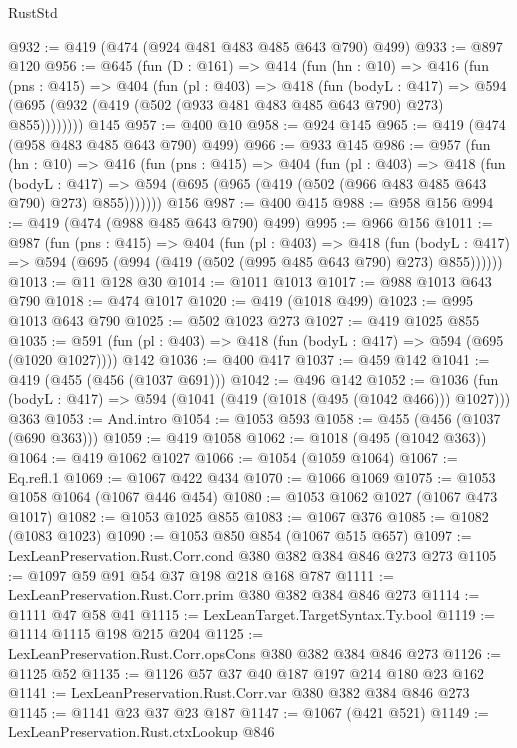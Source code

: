 \begin{lexlean}{RustStd}
\begin{coremodule}
@932 := @419 (@474 (@924 @481 @483 @485 @643 @790) @499)
@933 := @897 @120
@956 := @645
    (fun (D : @161) =>
    @414
      (fun (hn : @10) =>
      @416
        (fun (pns : @415) =>
        @404
          (fun (pl : @403) =>
          @418
            (fun (bodyL : @417) =>
            @594 (@695 (@932 (@419 (@502 (@933 @481 @483 @485 @643 @790) @273) @855))))))))
    @145
@957 := @400 @10
@958 := @924 @145
@965 := @419 (@474 (@958 @483 @485 @643 @790) @499)
@966 := @933 @145
@986 := @957
    (fun (hn : @10) =>
    @416
      (fun (pns : @415) =>
      @404
        (fun (pl : @403) =>
        @418
          (fun (bodyL : @417) =>
          @594 (@695 (@965 (@419 (@502 (@966 @483 @485 @643 @790) @273) @855)))))))
    @156
@987 := @400 @415
@988 := @958 @156
@994 := @419 (@474 (@988 @485 @643 @790) @499)
@995 := @966 @156
@1011 := @987
    (fun (pns : @415) =>
    @404
      (fun (pl : @403) =>
      @418
        (fun (bodyL : @417) => @594 (@695 (@994 (@419 (@502 (@995 @485 @643 @790) @273) @855))))))
@1013 := @11 @128 @30
@1014 := @1011 @1013
@1017 := @988 @1013 @643 @790
@1018 := @474 @1017
@1020 := @419 (@1018 @499)
@1023 := @995 @1013 @643 @790
@1025 := @502 @1023 @273
@1027 := @419 @1025 @855
@1035 := @591 (fun (pl : @403) => @418 (fun (bodyL : @417) => @594 (@695 (@1020 @1027)))) @142
@1036 := @400 @417
@1037 := @459 @142
@1041 := @419 (@455 (@456 (@1037 @691)))
@1042 := @496 @142
@1052 := @1036 (fun (bodyL : @417) => @594 (@1041 (@419 (@1018 (@495 (@1042 @466))) @1027))) @363
@1053 := And.intro
@1054 := @1053 @593
@1058 := @455 (@456 (@1037 (@690 @363)))
@1059 := @419 @1058
@1062 := @1018 (@495 (@1042 @363))
@1064 := @419 @1062 @1027
@1066 := @1054 (@1059 @1064)
@1067 := Eq.refl.{1}
@1069 := @1067 @422 @434
@1070 := @1066 @1069
@1075 := @1053 @1058 @1064 (@1067 @446 @454)
@1080 := @1053 @1062 @1027 (@1067 @473 @1017)
@1082 := @1053 @1025 @855
@1083 := @1067 @376
@1085 := @1082 (@1083 @1023)
@1090 := @1053 @850 @854 (@1067 @515 @657)
@1097 := LexLeanPreservation.Rust.Corr.cond @380 @382 @384 @846 @273 @273
@1105 := @1097 @59 @91 @54 @37 @198 @218 @168 @787
@1111 := LexLeanPreservation.Rust.Corr.prim @380 @382 @384 @846 @273
@1114 := @1111 @47 @58 @41
@1115 := LexLeanTarget.TargetSyntax.Ty.bool
@1119 := @1114 @1115 @198 @215 @204
@1125 := LexLeanPreservation.Rust.Corr.opsCons @380 @382 @384 @846 @273
@1126 := @1125 @52
@1135 := @1126 @57 @37 @40 @187 @197 @214 @180 @23 @162
@1141 := LexLeanPreservation.Rust.Corr.var @380 @382 @384 @846 @273
@1145 := @1141 @23 @37 @23 @187
@1147 := @1067 (@421 @521)
@1149 := LexLeanPreservation.Rust.ctxLookup @846

\end{coremodule}
\end{lexlean}

